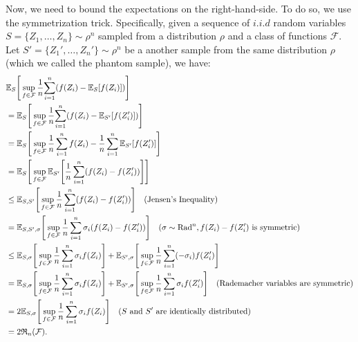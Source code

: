 \begin{proof*}
    \noindent Now, we need to bound the expectations on the right-hand-side. To do so, we use the symmetrization trick. Specifically, given a sequence of $i.i.d$ random variables $S = \{Z_1, \dots, Z_n\}\sim\rho^n$ sampled from a distribution $\rho$ and a class of functions $\mathcal{F}$. Let $S'=\{Z_1', \dots, Z_n'\}\sim\rho^n$ be a another sample from the same distribution $\rho$ (which we called the phantom sample), we have:
    \begin{equation}
    \label{eq:ulln_eq1}
    \begin{aligned}
        &\mathbb{E}_S\Bigg[ \sup_{f\in\mathcal{F}}\frac{1}{n}{\sum_{i=1}^n (f(Z_i) - \mathbb{E}_S[f(Z_i)])} \Bigg] \\
            &= \mathbb{E}_S\Bigg[ \sup_{f\in\mathcal{F}}\frac{1}{n}{\sum_{i=1}^n (f(Z_i) - \mathbb{E}_{S'}[f(Z_i')])} \Bigg] \\ 
            &= \mathbb{E}_S\Bigg[ \sup_{f\in\mathcal{F}}{
                \frac{1}{n}\sum_{i=1}^n f(Z_i) - \frac{1}{n}\sum_{i=1}^n \mathbb{E}_{S'}[f(Z_i')]
            } \Bigg] \\ 
            &= \mathbb{E}_{S}\Bigg[ 
                \sup_{f\in\mathcal{F}} {
                    \mathbb{E}_{S'}\Bigg[ 
                        \frac{1}{n}\sum_{i=1}^n (f(Z_i) - f(Z_i'))
                     \Bigg]
                }
             \Bigg] \\
            &\le \mathbb{E}_{S, S'}\Bigg[ 
                \sup_{f\in\mathcal{F}} {
                    \frac{1}{n}\sum_{i=1}^n (f(Z_i) - f(Z_i'))
                }
             \Bigg] \quad (\text{Jensen's Inequality}) \\ 
            &= \mathbb{E}_{S, S', \sigma}\Bigg[ 
                \sup_{f\in\mathcal{F}} {
                    \frac{1}{n}\sum_{i=1}^n \sigma_i(f(Z_i) - f(Z_i'))
                }
             \Bigg] \quad (\sigma\sim\mathrm{Rad}^n, f(Z_i) - f(Z_i')\text{ is symmetric}) \\ 
            &\le \mathbb{E}_{S, \sigma}\Bigg[ \sup_{f\in\mathcal{F}}{\frac{1}{n}\sum_{i=1}^n \sigma_if(Z_i)} \Bigg] + \mathbb{E}_{S', \sigma}\Bigg[ \sup_{f\in\mathcal{F}}{\frac{1}{n}\sum_{i=1}^n (-\sigma_i)f(Z_i')} \Bigg] \\ 
            &= \mathbb{E}_{S, \sigma}\Bigg[ \sup_{f\in\mathcal{F}}{\frac{1}{n}\sum_{i=1}^n \sigma_if(Z_i)} \Bigg] + \mathbb{E}_{S', \sigma}\Bigg[ \sup_{f\in\mathcal{F}}{\frac{1}{n}\sum_{i=1}^n \sigma_if(Z_i')} \Bigg] \quad \text{(Rademacher variables are symmetric)} \\ 
            &= 2\mathbb{E}_{S, \sigma}\Bigg[ \sup_{f\in\mathcal{F}}{\frac{1}{n}\sum_{i=1}^n \sigma_if(Z_i)} \Bigg] \quad \text{($S$ and $S'$ are identically distributed)}\\
            &= 2\mathfrak{R}_n(\mathcal{F}).
    \end{aligned}
    \end{equation}


\end{proof*}
